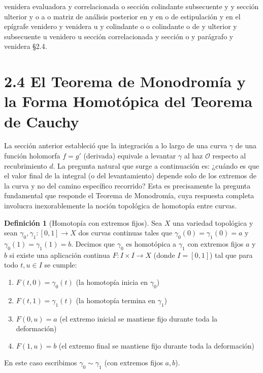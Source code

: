 \documentclass[11pt,a4paper]{article}
\theoremstyle{definition}
\newtheorem{definicion}{Definición}[section]
\theoremstyle{remark}
\numberwithin{equation}{section}
\begin{document}
venidera evaluadora y correlacionada o sección colindante subsecuente y y sección ulterior y o a o matriz de análisis posterior en y en o de estipulación y en el epígrafe venidero y venidera u y colindante o o colindante o de y ulterior y subsecuente u venidero u sección correlacionada y sección o y parágrafo y venidera \S 2.4.


\section{2.4 El Teorema de Monodromía y la Forma Homotópica del Teorema de Cauchy}

La sección anterior estableció que la integración a lo largo de una curva $\gamma$ de una función holomorfa $f=g'$ (derivada) equivale a levantar $\gamma$ al haz $\mathcal{O}$ respecto al recubrimiento $d$. La pregunta natural que surge a continuación es: ¿cuándo es que el valor final de la integral (o del levantamiento) depende solo de los extremos de la curva y no del camino específico recorrido? Esta es precisamente la pregunta fundamental que responde el Teorema de Monodromía, cuya respuesta completa involucra inexorablemente la noción topológica de homotopía entre curvas.

\begin{definicion}[Homotopía con extremos fijos]
Sea $X$ una variedad topológica y sean $\gamma_0, \gamma_1 : [0,1] \to X$ dos curvas continuas tales que $\gamma_0(0) = \gamma_1(0) = a$ y $\gamma_0(1) = \gamma_1(1) = b$. Decimos que $\gamma_0$ es homotópica a $\gamma_1$ con extremos fijos $a$ y $b$ si existe una aplicación continua $F : I \times I \to X$ (donde $I = [0,1]$) tal que para todo $t, u \in I$ se cumple:
\begin{enumerate}
    \item $F(t,0) = \gamma_0(t)$ (la homotopía inicia en $\gamma_0$)
    \item $F(t,1) = \gamma_1(t)$ (la homotopía termina en $\gamma_1$)
    \item $F(0,u) = a$ (el extremo inicial se mantiene fijo durante toda la deformación)
    \item $F(1,u) = b$ (el extremo final se mantiene fijo durante toda la deformación)
\end{enumerate}
En este caso escribimos $\gamma_0 \sim \gamma_1$ (con extremos fijos $a, b$).
\end{definicion}
\end{document}
